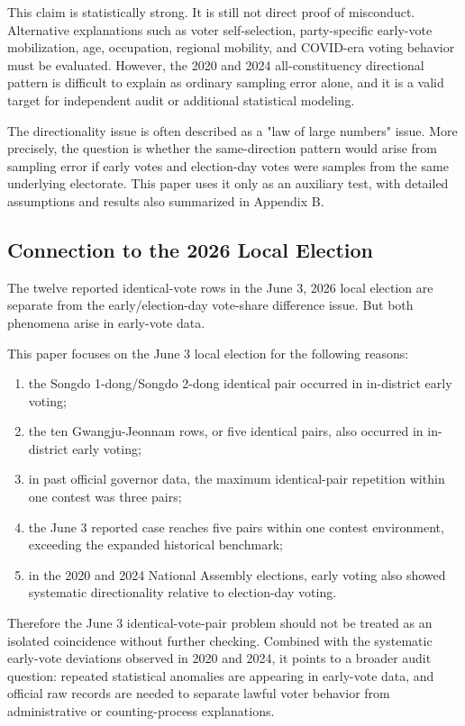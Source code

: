 \documentclass[preprint]{../ieie/IEIE}
\begin{document}
This claim is statistically strong. It is still not direct proof of misconduct. Alternative explanations such as voter self-selection, party-specific early-vote mobilization, age, occupation, regional mobility, and COVID-era voting behavior must be evaluated. However, the 2020 and 2024 all-constituency directional pattern is difficult to explain as ordinary sampling error alone, and it is a valid target for independent audit or additional statistical modeling.

The directionality issue is often described as a "law of large numbers" issue. More precisely, the question is whether the same-direction pattern would arise from sampling error if early votes and election-day votes were samples from the same underlying electorate. This paper uses it only as an auxiliary test, with detailed assumptions and results also summarized in Appendix B.

\subsection{Connection to the 2026 Local Election}

The twelve reported identical-vote rows in the June 3, 2026 local election are separate from the early/election-day vote-share difference issue. But both phenomena arise in early-vote data.

This paper focuses on the June 3 local election for the following reasons:

\begin{enumerate}
\item the Songdo 1-dong/Songdo 2-dong identical pair occurred in in-district early voting;
\item the ten Gwangju-Jeonnam rows, or five identical pairs, also occurred in in-district early voting;
\item in past official governor data, the maximum identical-pair repetition within one contest was three pairs;
\item the June 3 reported case reaches five pairs within one contest environment, exceeding the expanded historical benchmark;
\item in the 2020 and 2024 National Assembly elections, early voting also showed systematic directionality relative to election-day voting.
\end{enumerate}

Therefore the June 3 identical-vote-pair problem should not be treated as an isolated coincidence without further checking. Combined with the systematic early-vote deviations observed in 2020 and 2024, it points to a broader audit question: repeated statistical anomalies are appearing in early-vote data, and official raw records are needed to separate lawful voter behavior from administrative or counting-process explanations.
\end{document}
